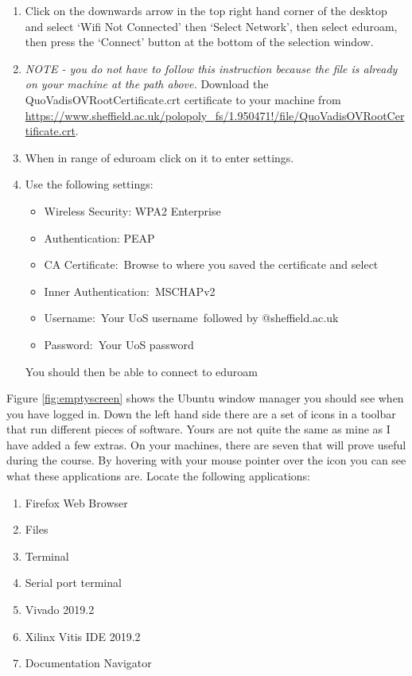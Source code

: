 \documentclass[../physical_computing.tex]{subfiles}
\begin{document}
\begin{enumerate}
\item{Click on the downwards arrow in the top right hand corner of the desktop and select `Wifi Not Connected' then `Select Network', then select eduroam, then press the `Connect' button at the bottom of the selection window.}
\item{{\it NOTE - you do not have to follow this instruction because the file is already on your machine at the path above.} Download the QuoVadisOVRootCertificate.crt certificate to your machine from \\
\url{https://www.sheffield.ac.uk/polopoly_fs/1.950471!/file/QuoVadisOVRootCertificate.crt}.\\
}
\item{When in range of eduroam click on it to enter settings.}
\item{Use the following settings:
\begin{itemize}
\item{Wireless Security: WPA2 Enterprise}
\item{Authentication: PEAP}
\item{CA Certificate: Browse to where you saved the certificate and select}
\item{Inner Authentication: MSCHAPv2}
\item{Username: Your UoS username followed by @sheffield.ac.uk}
\item{Password: Your UoS password}
\end{itemize}
You should then be able to connect to eduroam}
\end{enumerate}

Figure \ref{fig:emptyscreen} shows the Ubuntu window manager you should see when you have logged in. Down the left hand side there are a set of icons in a toolbar that run different pieces of software. Yours are not quite the same as mine as I have added a few extras. On your machines, there are seven that will prove useful during the course. By hovering with your mouse pointer over the icon you can see what these applications are. Locate the following applications:

\begin{enumerate}
    \item Firefox Web Browser
    \item Files
    \item Terminal
    \item Serial port terminal
    \item Vivado 2019.2
    \item Xilinx Vitis IDE 2019.2
    \item Documentation Navigator
\end{enumerate}
\end{document}
